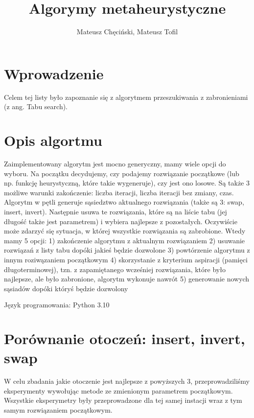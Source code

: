 \documentclass{article}
\begin{document}
    \begin{titlepage}
        \title{Algorymy metaheurystyczne}
        \author{Mateusz Chęciński, Mateusz Tofil}
        \maketitle
    \end{titlepage}

    \section{Wprowadzenie}

    Celem tej listy było zapoznanie się z algorytmem przeszukiwania z
    zabronieniami (z ang. Tabu search). 

    \section{Opis algortmu}

   Zaimplementowany algorytm jest mocno generyczny, mamy wiele opcji do wyboru.
   Na początku decydujemy, czy podajemy rozwiązanie początkowe 
   (lub np. funkcję heurystyczną, które takie wygeneruje), czy jest 
   ono losowe. Są także 3 możliwe warunki zakończenie: 
   liczba iteracji, liczba iteracji bez zmiany, czas.
   Algorytm w pętli generuje sąsiedztwo aktualnego rozwiązania
   (także są 3: swap, insert, invert). Następnie usuwa te rozwiązania,
   które są na liście tabu (jej długość także jest parametrem) i wybiera
   najlepsze z pozostałych. Oczywiście może zdarzyć się sytuacja, w której
   wszystkie rozwiązania są zabrobione. Wtedy mamy 5 opcji: 
   1) zakończenie algorytmu z aktualnym rozwiązaniem
   2) usuwanie rozwiązań z listy tabu dopóki jakieś będzie dozwolone
   3) powtórzenie algorytmu z innym roziwązaniem początkowym
   4) skorzystanie z kryterium aspiracji (pamięci długoterminowej), tzn.
   z zapamiętanego wcześniej rozwiązania, które było najlepsze, ale było zabronione,
   algorytm wykonuje nawrót
   5) generowanie nowych sąsiadów dopóki któryś będzie dozwolony
    

    \noindent Język programowania: Python 3.10

    \section{Porównanie otoczeń: insert, invert, swap}

    W celu zbadania jakie otoczenie jest najlepsze z
    powyższych 3, przeprowadziliśmy eksperymenty wywołując
    metode ze zmienionym parametrem początkowym. Wszystkie
    eksperymetry były przeprowadzone dla tej samej instacji
    wraz z tym samym rozwiązaniem początkowym.
    
\end{document}
